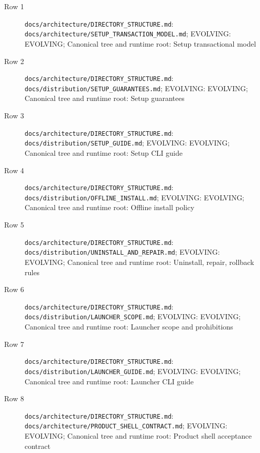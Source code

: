 \documentclass[9pt,a4paper,openany]{book}
\begin{document}
\begin{description}
\item[Row 1] \texttt{docs/\allowbreak{}architecture/\allowbreak{}DIRECTORY\_\allowbreak{}STRUCTURE.\allowbreak{}md}: \texttt{docs/\allowbreak{}architecture/\allowbreak{}SETUP\_\allowbreak{}TRANSACTION\_\allowbreak{}MODEL.\allowbreak{}md}; EVOLVING: EVOLVING; Canonical tree and runtime root: Setup transactional model
\item[Row 2] \texttt{docs/\allowbreak{}architecture/\allowbreak{}DIRECTORY\_\allowbreak{}STRUCTURE.\allowbreak{}md}: \texttt{docs/\allowbreak{}distribution/\allowbreak{}SETUP\_\allowbreak{}GUARANTEES.\allowbreak{}md}; EVOLVING: EVOLVING; Canonical tree and runtime root: Setup guarantees
\item[Row 3] \texttt{docs/\allowbreak{}architecture/\allowbreak{}DIRECTORY\_\allowbreak{}STRUCTURE.\allowbreak{}md}: \texttt{docs/\allowbreak{}distribution/\allowbreak{}SETUP\_\allowbreak{}GUIDE.\allowbreak{}md}; EVOLVING: EVOLVING; Canonical tree and runtime root: Setup CLI guide
\item[Row 4] \texttt{docs/\allowbreak{}architecture/\allowbreak{}DIRECTORY\_\allowbreak{}STRUCTURE.\allowbreak{}md}: \texttt{docs/\allowbreak{}distribution/\allowbreak{}OFFLINE\_\allowbreak{}INSTALL.\allowbreak{}md}; EVOLVING: EVOLVING; Canonical tree and runtime root: Offline install policy
\item[Row 5] \texttt{docs/\allowbreak{}architecture/\allowbreak{}DIRECTORY\_\allowbreak{}STRUCTURE.\allowbreak{}md}: \texttt{docs/\allowbreak{}distribution/\allowbreak{}UNINSTALL\_\allowbreak{}AND\_\allowbreak{}REPAIR.\allowbreak{}md}; EVOLVING: EVOLVING; Canonical tree and runtime root: Uninstall, repair, rollback rules
\item[Row 6] \texttt{docs/\allowbreak{}architecture/\allowbreak{}DIRECTORY\_\allowbreak{}STRUCTURE.\allowbreak{}md}: \texttt{docs/\allowbreak{}distribution/\allowbreak{}LAUNCHER\_\allowbreak{}SCOPE.\allowbreak{}md}; EVOLVING: EVOLVING; Canonical tree and runtime root: Launcher scope and prohibitions
\item[Row 7] \texttt{docs/\allowbreak{}architecture/\allowbreak{}DIRECTORY\_\allowbreak{}STRUCTURE.\allowbreak{}md}: \texttt{docs/\allowbreak{}distribution/\allowbreak{}LAUNCHER\_\allowbreak{}GUIDE.\allowbreak{}md}; EVOLVING: EVOLVING; Canonical tree and runtime root: Launcher CLI guide
\item[Row 8] \texttt{docs/\allowbreak{}architecture/\allowbreak{}DIRECTORY\_\allowbreak{}STRUCTURE.\allowbreak{}md}: \texttt{docs/\allowbreak{}architecture/\allowbreak{}PRODUCT\_\allowbreak{}SHELL\_\allowbreak{}CONTRACT.\allowbreak{}md}; EVOLVING: EVOLVING; Canonical tree and runtime root: Product shell acceptance contract

\end{description}
\end{document}
